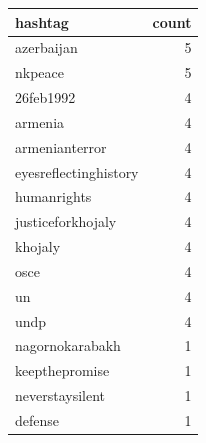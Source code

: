 \begin{tabular}{lr}
\toprule
hashtag & count \\
\midrule
azerbaijan & 5 \\
nkpeace & 5 \\
26feb1992 & 4 \\
armenia & 4 \\
armenianterror & 4 \\
eyesreflectinghistory & 4 \\
humanrights & 4 \\
justiceforkhojaly & 4 \\
khojaly & 4 \\
osce & 4 \\
un & 4 \\
undp & 4 \\
nagornokarabakh & 1 \\
keepthepromise & 1 \\
neverstaysilent & 1 \\
defense & 1 \\
\bottomrule
\end{tabular}
